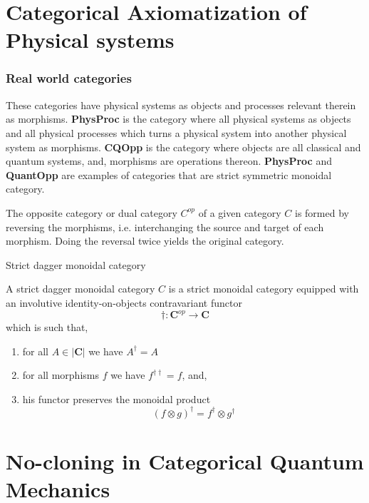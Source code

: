 \documentclass[11pt]{beamer}
\begin{document}
\section{Categorical Axiomatization of Physical systems}

\begin{frame}


\frametitle{Real world categories}
These categories have physical systems as objects and processes relevant therein as morphisms. \textbf{PhysProc} is the category where all physical systems as objects and all physical processes which turns a physical system into another physical system as morphisms. \textbf{CQOpp} is the category where objects are all classical and quantum systems, and, morphisms are operations thereon. \textbf{PhysProc} and \textbf{QuantOpp} are examples of categories that are strict symmetric monoidal category.
    \begin{definition}
    The opposite category or dual category $C^{op}$ of a given category $C$ is formed by reversing the morphisms, i.e. interchanging the source and target of each morphism. Doing the reversal twice yields the original category.
    \end{definition}
\end{frame}
\begin{frame}{Strict dagger monoidal category}
    \begin{definition}
    A strict dagger monoidal category $C$ is a strict monoidal category equipped with an involutive identity-on-objects contravariant functor
    $$\dagger:\textbf{C}^{op}\rightarrow \textbf{C} $$
    which is such that,
    \begin{enumerate}
        \item for all $A \in |\textbf{C}|$ we have $A^\dagger = A$
        \item for all morphisms $f$ we have $f^{\dagger\dagger} = f$, and,
        \item his functor preserves the monoidal product
        $$(f\otimes g)^{\dagger}=f^\dagger\otimes g^\dagger $$

    \end{enumerate}
    \end{definition}
\end{frame}
\section{No-cloning in Categorical Quantum
Mechanics}
\end{document}
